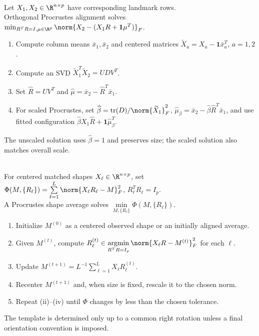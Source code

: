 \begin{method} \label{meth:sl-procrustes-shape-alignment} \\
Let $X_1,X_2\in\R^{n\times p}$ have corresponding landmark rows.\\
Orthogonal Procrustes alignment solves $\min_{R^TR=I,\mu\in\R^p}\norm{X_2-(X_1R+\mathbf{1}\mu^T)}_F$.
\begin{enumerate}[label=(\roman*)]
\setlength{\itemsep}{0pt}
\item Compute column means $\bar{x}_1,\bar{x}_2$ and centered matrices $\widetilde{X}_a=X_a-\mathbf{1}\bar{x}_a^T$, $a=1,2$.
\item Compute an SVD $\widetilde{X}_1^T\widetilde{X}_2=UDV^T$.
\item Set $\widehat{R}=UV^T$ and $\widehat{\mu}=\bar{x}_2-\widehat{R}^T\bar{x}_1$.
\item For scaled Procrustes, set $\widehat{\beta}=\operatorname{tr}(D)/\norm{\widetilde{X}_1}_F^2$, $\widehat{\mu}_{\beta}=\bar{x}_2-\widehat{\beta}\widehat{R}^T\bar{x}_1$, and use fitted configuration $\widehat{\beta}X_1\widehat{R}+\mathbf{1}\widehat{\mu}_{\beta}^T$.
\end{enumerate}
The unscaled solution uses $\widehat{\beta}=1$ and preserves size; the scaled solution also matches overall scale.
\end{method}

\begin{method} \label{meth:sl-procrustes-shape-average} \\
For centered matched shapes $X_\ell\in\R^{n\times p}$, set $\Phi(M,\{R_\ell\})=\sum\limits_{\ell=1}^L\norm{X_\ell R_\ell-M}_F^2$, $R_\ell^TR_\ell=I_p$.\\
A Procrustes shape average solves $\min\limits_{M,\{R_\ell\}}\Phi(M,\{R_\ell\})$.
\begin{enumerate}[label=(\roman*)]
\setlength{\itemsep}{0pt}
\item Initialize $M^{(0)}$ as a centered observed shape or an initially aligned average.
\item Given $M^{(t)}$, compute $R_\ell^{(t)}\in\operatorname*{argmin}\limits_{R^TR=I_p}\norm{X_\ell R-M^{(t)}}_F^2$ for each $\ell$.
\item Update $M^{(t+1)}=L^{-1}\sum\limits_{\ell=1}^LX_\ell R_\ell^{(t)}$.
\item Recenter $M^{(t+1)}$ and, when size is fixed, rescale it to the chosen norm.
\item Repeat (ii)--(iv) until $\Phi$ changes by less than the chosen tolerance.
\end{enumerate}
The template is determined only up to a common right rotation unless a final orientation convention is imposed.
\end{method}

